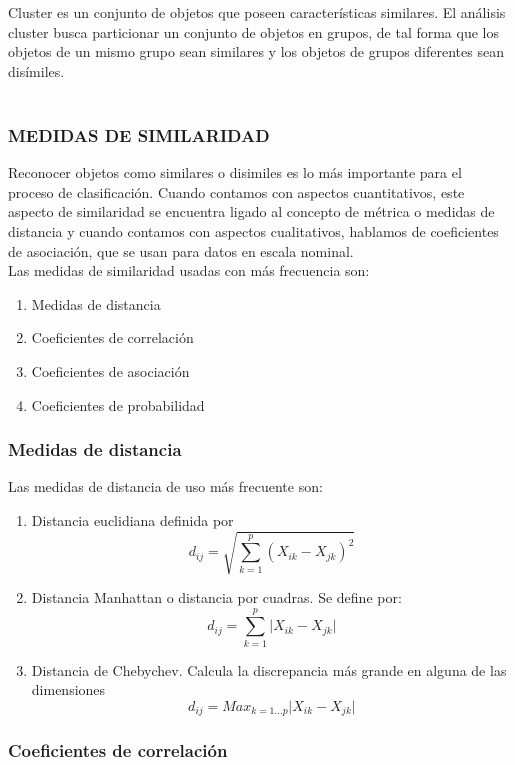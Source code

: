 \documentclass[letterpaper,12pt, spanish]{article}
\begin{document}
Cluster es un conjunto de objetos que poseen características similares.  El análisis cluster busca particionar un conjunto de objetos en grupos, de tal forma que los objetos de un mismo grupo sean similares y los objetos de grupos diferentes sean disímiles.         
\ \\
\ \\
\subsubsection{MEDIDAS DE SIMILARIDAD}

Reconocer objetos como similares o disimiles es lo más importante para el proceso de clasificación.  Cuando contamos con aspectos cuantitativos, este aspecto de similaridad se encuentra ligado al concepto de métrica o medidas de distancia y cuando contamos con aspectos cualitativos, hablamos de coeficientes de asociación, que se usan para datos en escala nominal.
\ \\
Las medidas de similaridad usadas con más frecuencia son: 
\begin{enumerate}
\item Medidas de distancia
\item Coeficientes de correlación 
\item Coeficientes de asociación
\item Coeficientes de probabilidad
\end{enumerate}

\subsubsection*{Medidas de distancia}

Las medidas de distancia de uso más frecuente son:

\begin{enumerate}
\item Distancia euclidiana definida por
$$d_{ij} = \sqrt{\sum \limits_{k=1}^{p} (X_{ik}-X_{	jk})^2}$$
\item Distancia Manhattan o distancia por cuadras. Se define por:
$$d_{ij} = \sum \limits_{k=1}^{p} \vert X_{ik}-X_{jk} \vert$$
\item Distancia de Chebychev.  Calcula la discrepancia más grande en alguna de las dimensiones
$$d_{ij} = Max_{k=1...p} \vert X_{ik}-X_{jk} \vert$$
\end{enumerate}

\subsubsection*{Coeficientes de correlación}
\end{document}
